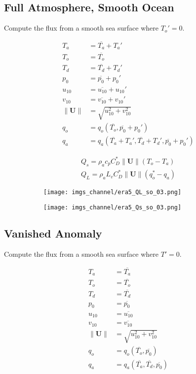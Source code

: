 \documentclass[12pt,a4paper]{article}
\newcommand{\Vmag}[1]{\| \mathbf{#1}\|}
\begin{document}
\subsection{Full Atmosphere, Smooth Ocean}
Compute the flux from a smooth sea surface where $T_o' = 0$.

\begin{align}
T_a &=\overline{T_a} + T_a' \\
T_o &=\overline{T_o}  \\
T_d &=\overline{T_d} + T_d' \\
p_0 &=\overline{p_0} + p_0' \\
u_{10} &= \overline{u_{10}} + u_{10}' \\
v_{10} &= \overline{v_{10}} + v_{10}'\\
\Vmag{U} &= \sqrt{u_{10}^2 + v_{10}^2}\\
q_o &= q_o(\overline{T_o},\overline{p_0}+p_0')\\
q_a &= q_a(\overline{T_a}+T_a',\overline{T_d}+T_d',\overline{p_0}+p_0')
\end{align}

\begin{align}
Q_s = \rho_a c_p  C_D^* \Vmag{U} (T_o-T_a) \label{Eq:Qs}\\
Q_L = \rho_a L_v  C_D^* \Vmag{U} (q_o^*-q_a) \label{Eq:QL}
\end{align}


\begin{figure}[h!]
\centering
\begin{subfigure}[t]{0.49\textwidth}
\texttt{[image: imgs\_channel/era5\_QL\_so\_03.png]}
\end{subfigure}
\begin{subfigure}[t]{0.49\textwidth}
\texttt{[image: imgs\_channel/era5\_Qs\_so\_03.png]}
\end{subfigure}
\end{figure}


\subsection{Vanished Anomaly}
Compute the flux from a smooth sea surface where $T' = 0$.

\begin{align}
T_a &=\overline{T_a} \\
T_o &=\overline{T_o}  \\
T_d &=\overline{T_d} \\
p_0 &=\overline{p_0} \\
u_{10} &= \overline{u_{10}} \\
v_{10} &= \overline{v_{10}} \\
\Vmag{U} &= \sqrt{u_{10}^2 + v_{10}^2}\\
q_o &= q_o(\overline{T_o},\overline{p_0})\\
q_a &= q_a(\overline{T_a},\overline{T_d},\overline{p_0})
\end{align}
\end{document}
